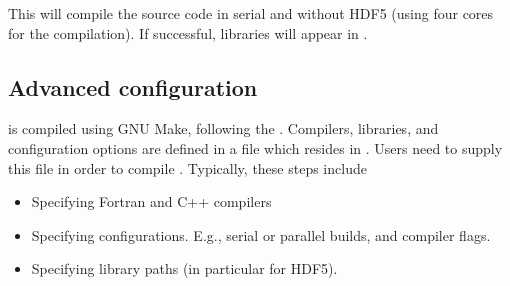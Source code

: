 \documentclass[letterpaper,10pt,english]{sphinxmanual}
\begin{document}
This will compile the  source code in serial and without HDF5 (using four cores for the compilation).
If successful,  libraries will appear in .


\subsection{Advanced configuration}
\label{\detokenize{Base/Installation:advanced-configuration}}
 is compiled using GNU Make, following the .
Compilers, libraries, and configuration options are defined in a file  which resides in .
Users need to supply this file in order to compile .
Typically, these steps include
\begin{itemize}
\item {} 
Specifying Fortran and C++ compilers

\item {} 
Specifying configurations. E.g., serial or parallel builds, and compiler flags.

\item {} 
Specifying library paths (in particular for HDF5).

\end{itemize}
\end{document}
